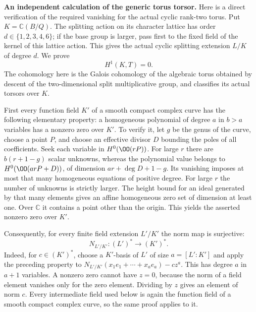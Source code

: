 \par\medskip\noindent\textbf{An independent calculation of the generic torus torsor.}
Here is a direct verification of the required vanishing
for the actual cyclic rank-two torus. Put
$K=\mathbb C(B/Q)$. The splitting action on its
character lattice has order $d\in\{1,2,3,4,6\}$;
if the base group is larger, pass first to the fixed
field of the kernel of this lattice action. This gives
the actual cyclic splitting extension $L/K$ of degree $d$.
We prove
\[
                         H^1(K,T)=0.                 \tag{C.EO.H1}
\]
The cohomology here is the Galois cohomology of the
algebraic torus obtained by descent of the two-dimensional
split multiplicative group, and classifies its actual
torsors over $K$.

First every function field $K'$ of a smooth compact
complex curve has the following elementary property:
a homogeneous polynomial of degree $a$ in $b>a$
variables has a nonzero zero over $K'$. To verify it,
let $g$ be the genus of the curve, choose a point $P$,
and choose an effective divisor $D$ bounding the poles
of all coefficients. Seek each variable in
$H^0(\OO(rP))$. For large $r$ there are
$b(r+1-g)$ scalar unknowns, whereas the polynomial
value belongs to $H^0(\OO(arP+D))$, of dimension
$ar+\deg D+1-g$. Its vanishing imposes at most that
many homogeneous equations of positive degree.
For large $r$ the number of unknowns is strictly
larger. The height bound for an ideal generated by
that many elements gives an affine homogeneous zero
set of dimension at least one. Over $\mathbb C$ it
contains a point other than the origin. This yields
the asserted nonzero zero over $K'$.

Consequently, for every finite field extension
$L'/K'$ the norm map is surjective:
\[
               N_{L'/K'}:(L')^*\longrightarrow(K')^*.
                                                               \tag{C.EO.H2}
\]
Indeed, for $c\in(K')^*$, choose a $K'$-basis of
$L'$ of size $a=[L':K']$ and apply the preceding
property to
$N_{L'/K'}(x_1e_1+\cdots+x_ae_a)-cz^a$.
This has degree $a$ in $a+1$ variables.
A nonzero zero cannot have $z=0$, because the norm
of a field element vanishes only for the zero element.
Dividing by $z$ gives an element of norm $c$.
Every intermediate field used below is again the
function field of a smooth compact complex curve,
so the same proof applies to it.

